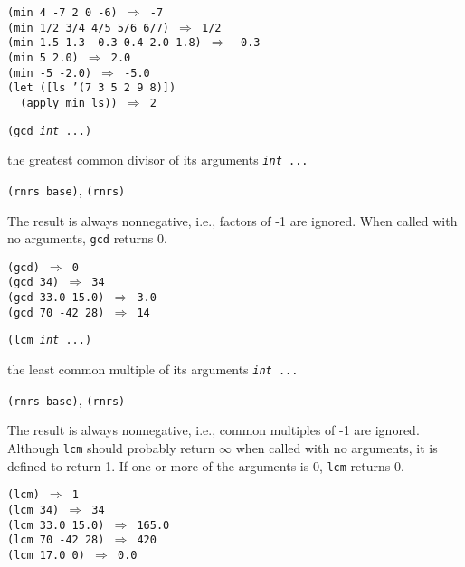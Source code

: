 \begin{alltt}
(min 4 -7 2 0 -6) \(\Rightarrow\) -7
(min 1/2 3/4 4/5 5/6 6/7) \(\Rightarrow\) 1/2
(min 1.5 1.3 -0.3 0.4 2.0 1.8) \(\Rightarrow\) -0.3
(min 5 2.0) \(\Rightarrow\) 2.0
(min -5 -2.0) \(\Rightarrow\) -5.0
(let ([ls '(7 3 5 2 9 8)])
  (apply min ls)) \(\Rightarrow\) 2
\end{alltt}

\begin{description}

\label{objects_s109}\label{objects_page_gcd}
\item[procedure] \texttt{(gcd \textit{int} ...)}



\item[returns] the greatest common divisor of its arguments \texttt{\textit{int} ...}


\item[libraries] \texttt{(rnrs base)}, \texttt{(rnrs)}
\end{description}


The result is always nonnegative, i.e., factors of -1 are ignored.
When called with no arguments, \texttt{gcd} returns 0.


\begin{alltt}
(gcd) \(\Rightarrow\) 0
(gcd 34) \(\Rightarrow\) 34
(gcd 33.0 15.0) \(\Rightarrow\) 3.0
(gcd 70 -42 28) \(\Rightarrow\) 14
\end{alltt}

\begin{description}

\label{objects_s110}\item[procedure] \texttt{(lcm \textit{int} ...)}



\item[returns] the least common multiple of its arguments \texttt{\textit{int} ...}


\item[libraries] \texttt{(rnrs base)}, \texttt{(rnrs)}
\end{description}


The result is always nonnegative, i.e., common multiples of -1 are
ignored.
Although \texttt{lcm} should probably return \(\infty\) when called with no
arguments, it is defined to return 1.
If one or more of the arguments is 0, \texttt{lcm} returns 0.


\begin{alltt}
(lcm) \(\Rightarrow\) 1
(lcm 34) \(\Rightarrow\) 34
(lcm 33.0 15.0) \(\Rightarrow\) 165.0
(lcm 70 -42 28) \(\Rightarrow\) 420
(lcm 17.0 0) \(\Rightarrow\) 0.0
\end{alltt}

